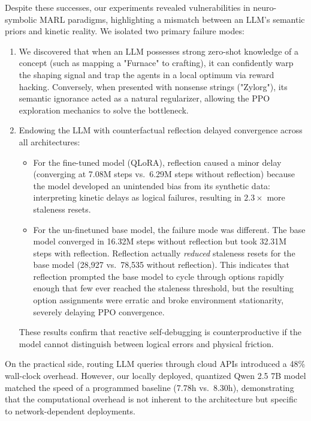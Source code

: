 Despite these successes, our experiments revealed vulnerabilities in neuro-symbolic MARL paradigms, highlighting a mismatch between an LLM's semantic priors and kinetic reality. We isolated two primary failure modes:

\begin{enumerate}
    \item We discovered that when an LLM possesses strong zero-shot knowledge of a concept (such as mapping a "Furnace" to crafting), it can confidently warp the shaping signal and trap the agents in a local optimum via reward hacking. Conversely, when presented with nonsense strings ("Zylorg"), its semantic ignorance acted as a natural regularizer, allowing the PPO exploration mechanics to solve the bottleneck.
    \item Endowing the LLM with counterfactual reflection delayed convergence across all architectures:
    \begin{itemize}
        \item For the fine-tuned model (QLoRA), reflection caused a minor delay (converging at 7.08M steps vs.\ 6.29M steps without reflection) because the model developed an unintended bias from its synthetic data: interpreting kinetic delays as logical failures, resulting in $2.3\times$ more staleness resets.
        \item For the un-finetuned base model, the failure mode was different. The base model converged in 16.32M steps without reflection but took 32.31M steps with reflection. Reflection actually \textit{reduced} staleness resets for the base model (28{,}927 vs.\ 78{,}535 without reflection). This indicates that reflection prompted the base model to cycle through options rapidly enough that few ever reached the staleness threshold, but the resulting option assignments were erratic and broke environment stationarity, severely delaying PPO convergence.
    \end{itemize}
    These results confirm that reactive self-debugging is counterproductive if the model cannot distinguish between logical errors and physical friction.
\end{enumerate}

On the practical side, routing LLM queries through cloud APIs introduced a 48\% wall-clock overhead. However, our locally deployed, quantized Qwen 2.5 7B model matched the speed of a programmed baseline (7.78h vs.\ 8.30h), demonstrating that the computational overhead is not inherent to the architecture but specific to network-dependent deployments.

